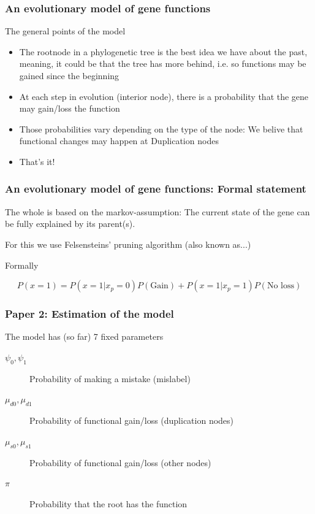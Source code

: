 \documentclass[aspectratio=169, 10pt]{beamer}
\begin{document}
\begin{frame}
\frametitle{An evolutionary model of gene functions}

The general points of the model
\begin{itemize}
\item The rootnode in a phylogenetic tree is the best idea we have about the past, meaning,
it could be that the tree has more behind, i.e. so functions may be gained since the beginning
\item At each step in evolution (interior node), there is a probability that the gene may
gain/loss the function
\item Those probabilities vary depending on the type of the node: We belive that functional
changes may happen at Duplication nodes
\item That's it!
\end{itemize}
\end{frame}

\begin{frame}
\frametitle{An evolutionary model of gene functions: Formal statement}

The whole is based on the markov-assumption: The current state of the gene can be
fully explained by its parent(s).

For this we use Felsensteins' pruning algorithm (also known as...)

Formally

$$
P(x = 1) = P(x = 1| x_p = 0)P(\mbox{Gain}) + P(x = 1| x_p = 1)P(\mbox{No loss})
$$

\end{frame}

\begin{frame}
\frametitle{Paper 2: Estimation of the model}
The model has (so far) 7 fixed parameters
\begin{description}
\item[$\psi_0, \psi_1$] Probability of making a mistake (mislabel)
\item[$\mu_{d0}, \mu_{d1}$] Probability of functional gain/loss (duplication nodes)
\item[$\mu_{s0}, \mu_{s1}$] Probability of functional gain/loss (other nodes)
\item[$\pi$] Probability that the root has the function
\end{description}
\end{frame}
\end{document}
